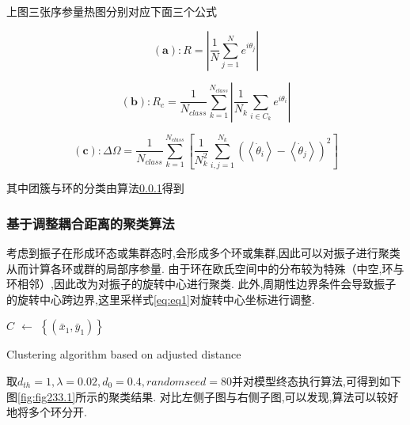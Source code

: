 \documentclass{article}
\begin{document}
上图三张序参量热图分别对应下面三个公式

$$
\mathbf{(a)}: R = \left| \frac{1}{N}\sum_{j=1}^N{e^{i\theta _j}} \right|
$$

$$
\mathbf{(b)}: R_c = \frac{1}{N_{class}}\sum_{k=1}^{N_{class}}{\left| \frac{1}{N_k}\sum_{i\in C_k}{e^{i\theta _i}} \right|}
$$

$$
\mathbf{(c)}: \Delta \Omega =\frac{1}{N_{class}}\sum_{k=1}^{N_{class}}{\left[ \frac{1}{N_{k}^{2}}\sum_{i,j=1}^{N_k}{\left( \left< \dot{\theta}_i \right> -\left< \dot{\theta}_j \right> \right) ^2} \right]}
$$

其中团簇与环的分类由算法\ref{clustering}得到

\newpage
\subsubsection{基于调整耦合距离的聚类算法}\label{clustering}

考虑到振子在形成环态或集群态时,会形成多个环或集群,因此可以对振子进行聚类从而计算各环或群的局部序参量. 由于环在欧氏空间中的分布较为特殊（中空,环与环相邻）,因此改为对振子的旋转中心进行聚类. 此外,周期性边界条件会导致振子的旋转中心跨边界,这里采样式\ref{eq:eq1}对旋转中心坐标进行调整.

\begin{algorithm}

	\BlankLine
	\emph{$C$ $\leftarrow$ $\left\{(\bar{x}_1, \bar{y}_1)\right\}$}\;
	\caption{Clustering algorithm based on adjusted distance}\label{algo_disjdecomp}
\end{algorithm}\DecMargin{1em}

取$d_{th}=1, \lambda=0.02, d_0=0.4, random seed=80$并对模型终态执行算法,可得到如下图\ref{fig:fig233.1}所示的聚类结果. 对比左侧子图与右侧子图,可以发现,算法可以较好地将多个环分开.
\end{document}
